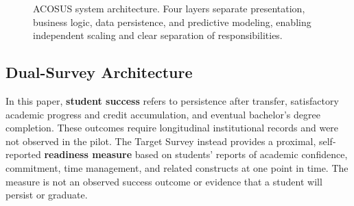 \documentclass[letterpaper,11pt]{article}
\begin{document}
\begin{figure}[htbp]
{
}%
\caption{ACOSUS system architecture. Four layers separate presentation, business logic, data persistence, and predictive modeling, enabling independent scaling and clear separation of responsibilities.}
\label{fig:architecture}
\end{figure}

\subsection{Dual-Survey Architecture}\label{subsec:dualsurvey}

In this paper, \textbf{student success} refers to persistence after transfer, satisfactory academic progress and credit accumulation, and eventual bachelor's degree completion. These outcomes require longitudinal institutional records and were not observed in the pilot. The Target Survey instead provides a proximal, self-reported \textbf{readiness measure} based on students' reports of academic confidence, commitment, time management, and related constructs at one point in time. The measure is not an observed success outcome or evidence that a student will persist or graduate.
\end{document}
